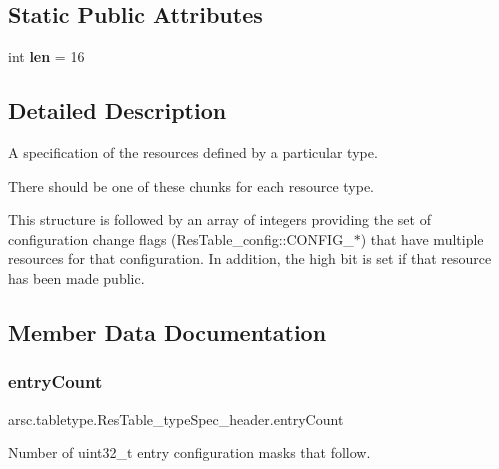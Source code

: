\subsection*{Static Public Attributes}
\begin{DoxyCompactItemize}
\item 
\mbox{\label{classarsc_1_1tabletype_1_1ResTable__typeSpec__header_a80eb2f7254c76e1996f628f61a1b4676}} 
int {\bfseries len} = 16
\end{DoxyCompactItemize}


\subsection{Detailed Description}
A specification of the resources defined by a particular type. 

There should be one of these chunks for each resource type.

This structure is followed by an array of integers providing the set of configuration change flags (Res\+Table\+\_\+config\+::\+C\+O\+N\+F\+I\+G\+\_\+$\ast$) that have multiple resources for that configuration. In addition, the high bit is set if that resource has been made public. 

\subsection{Member Data Documentation}
\mbox{\label{classarsc_1_1tabletype_1_1ResTable__typeSpec__header_a6747faeedd7cb05811bf2202c27e3152}} 
\subsubsection{\texorpdfstring{entry\+Count}{entryCount}}
{\footnotesize\ttfamily arsc.\+tabletype.\+Res\+Table\+\_\+type\+Spec\+\_\+header.\+entry\+Count}



Number of uint32\+\_\+t entry configuration masks that follow. 

